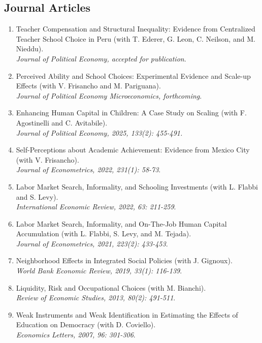 \documentclass[12pt,english]{article}
\newcommand\reverselabel[1]{%
  \def\theenumi{}%
  \renewcommand\makelabel{\makebox[\dimexpr\labelwidth-3pt\relax][r]{%
    \the\numexpr#1-\value{enumi}+1\relax}}}%
\begin{document}
\subsection*{Journal Articles}
\begin{enumerate}
\reverselabel{9}
\item Teacher Compensation and Structural Inequality: Evidence from Centralized Teacher School Choice in Peru (with T. Ederer, G. Leon, C. Neilson, and M. Nieddu).
\\
\textit{Journal of Political Economy, accepted for publication}.

\item Perceived Ability and School Choices: Experimental Evidence and Scale-up Effects (with V. Frisancho and M. Pariguana).  
\\
\textit{Journal of Political Economy Microeconomics, forthcoming}.
\item Enhancing Human Capital in Children: A Case Study on Scaling (with F. Agostinelli and C. Avitabile).\\ \textit{Journal of Political Economy, 2025, 133(2): 455-491.}
\item Self-Perceptions about Academic Achievement: Evidence from Mexico City (with V. Frisancho). \\
\textit{Journal of Econometrics, 2022, 231(1): 58-73}.  
\item  Labor Market Search, Informality, and Schooling Investments (with L. Flabbi and S. Levy). \\ \textit{International Economic Review, 2022, 63: 211-259}.  
\item  Labor Market Search, Informality, and On-The-Job Human Capital Accumulation (with L. Flabbi, S. Levy, and M. Tejada). \\ \textit{Journal of Econometrics, 2021, 223(2): 433-453}. 
\item Neighborhood Effects in Integrated Social Policies (with J. Gignoux). \\ \textit{World Bank Economic Review, 2019, 33(1): 116-139}.
\item Liquidity, Risk and Occupational Choices (with M. Bianchi). \\ \textit{Review of Economic Studies, 2013, 80(2): 491-511}.
\item Weak Instruments and Weak Identification in Estimating the Effects of Education on Democracy (with D. Coviello).\\ \textit{Economics Letters, 2007, 96: 301-306}.
\end{enumerate}
\end{document}
